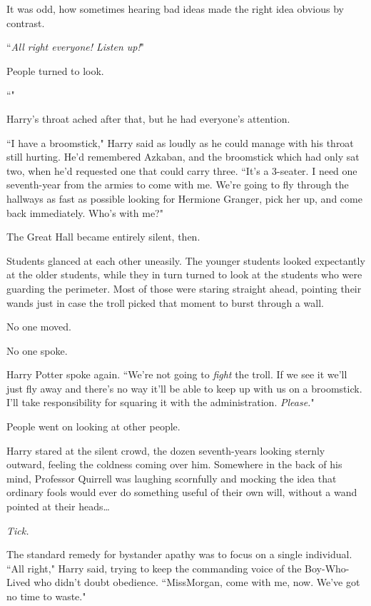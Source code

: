 It was odd, how sometimes hearing bad ideas made the right idea obvious by contrast.

``\emph{All right everyone! Listen up!}"

People turned to look.

``"

Harry's throat ached after that, but he had everyone's attention.

``I have a broomstick," Harry said as loudly as he could manage with his throat still hurting. He'd remembered Azkaban, and the broomstick which had only sat two, when he'd requested one that could carry three. ``It's a 3-seater. I need one seventh-year from the armies to come with me. We're going to fly through the hallways as fast as possible looking for Hermione Granger, pick her up, and come back immediately. Who's with me?"

The Great Hall became entirely silent, then.

\later

Students glanced at each other uneasily. The younger students looked expectantly at the older students, while they in turn turned to look at the students who were guarding the perimeter. Most of those were staring straight ahead, pointing their wands just in case the troll picked that moment to burst through a wall.

No one moved.

No one spoke.

Harry Potter spoke again. ``We're not going to \emph{fight} the troll. If we see it we'll just fly away and there's no way it'll be able to keep up with us on a broomstick. I'll take responsibility for squaring it with the administration. \emph{Please.}"

People went on looking at other people.

\later

Harry stared at the silent crowd, the dozen seventh-years looking sternly outward, feeling the coldness coming over him. Somewhere in the back of his mind, Professor Quirrell was laughing scornfully and mocking the idea that ordinary fools would ever do something useful of their own will, without a wand pointed at their heads{\ldots}

\emph{Tick.}

The standard remedy for bystander apathy was to focus on a single individual. ``All right," Harry said, trying to keep the commanding voice of the Boy-Who-Lived who didn't doubt obedience. ``Miss\?Morgan, come with me, now. We've got no time to waste."

